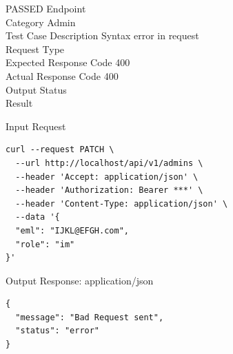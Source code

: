\begin{testcase}{33}{PASSED}
Endpoint \hfill {}\\
Category \hfill Admin\\
Test Case Description \hfill Syntax error in request\\

Request Type    \hfill {}\\
Expected Response Code    \hfill 400\\
Actual Response Code    \hfill 400\\

Output Status \hfill {}\\
Result \hfill {}

\begin{ipblock}{Input Request}
\begin{verbatim}
curl --request PATCH \
  --url http://localhost/api/v1/admins \
  --header 'Accept: application/json' \
  --header 'Authorization: Bearer ***' \
  --header 'Content-Type: application/json' \
  --data '{
  "eml": "IJKL@EFGH.com",
  "role": "im"
}'
\end{verbatim}
\end{ipblock}

\begin{opblock}{Output Response: application/json}
\begin{verbatim}
{
  "message": "Bad Request sent",
  "status": "error"
}
\end{verbatim}
\end{opblock}
\end{testcase}

